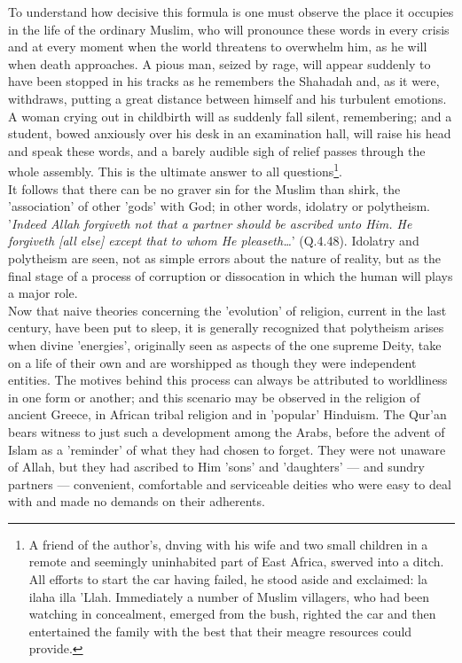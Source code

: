 \documentclass[11pt, b5paper, twoside]{book}
\begin{document}
To understand how decisive this formula is one must observe the place it occupies in the life of the 
ordinary Muslim, who will pronounce these words in every crisis and at every moment when the world 
threatens to overwhelm him, as he will when death approaches. A pious man, seized by rage, will 
appear suddenly to have been stopped in his tracks as he remembers the Shahadah and, as it were, 
withdraws, putting a great distance between himself and his turbulent emotions. A woman crying out in 
childbirth will as suddenly fall silent, remembering; and a student, bowed anxiously over his desk in 
an examination hall, will raise his head and speak these words, and a barely audible sigh of relief 
passes through the whole assembly. This is the ultimate answer to all questions\footnote{A friend of the author's, dnving with his wife and two small children in a remote and seemingly uninhabited part of East Africa, swerved into a ditch. All efforts to start the car having failed, he stood aside and exclaimed: la ilaha illa 'Llah. Immediately a number of Muslim villagers, who had been watching in concealment, emerged from the bush, righted the car and then entertained the family with the best that their meagre resources could provide.}. \\

It follows that there can be no graver sin for the Muslim than shirk, the 'association' of other 
'gods' with God; in other words, idolatry or polytheism. '\emph{Indeed Allah forgiveth not that a partner 
should be ascribed unto Him. He forgiveth [all else] except that to whom He pleaseth\ldots{}}' (Q.4.48). 
Idolatry and polytheism are seen, not as simple errors about the nature of reality, but as the final 
stage of a process of corruption or dissocation in which the human will plays a major role. \\

Now that naive theories concerning the 'evolution' of religion, current in the last century, have 
been put to sleep, it is generally recognized that polytheism arises when divine 'energies', 
originally seen as aspects of the one supreme Deity, take on a life of their own and are worshipped 
as though they were independent entities. The motives behind this process can always be attributed to 
worldliness in one form or another; and this scenario may be observed in the religion of ancient 
Greece, in African tribal religion and in 'popular' Hinduism. The Qur'an bears witness to just such a 
development among the Arabs, before the advent of Islam as a 'reminder' of what they had chosen to 
forget. They were not unaware of Allah, but they had ascribed to Him 'sons' and 'daughters' --- and 
sundry partners --- convenient, comfortable and serviceable deities who were easy to deal with and made 
no demands on their adherents. \\
\end{document}
